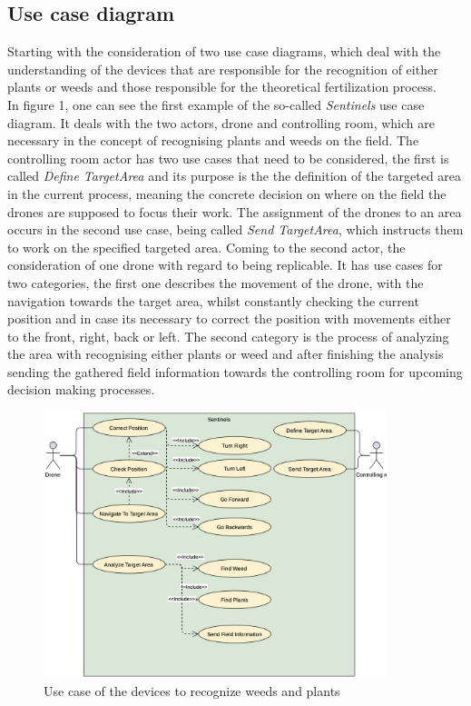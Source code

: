 \documentclass[english]{lni}
\begin{document}
\subsection{Use case diagram}
Starting with the consideration of two use case diagrams, which deal with the understanding of the devices that are responsible for the recognition of either plants or weeds and those responsible for the theoretical fertilization process.\\
In figure 1, one can see the first example of the so-called \textit{Sentinels} use case diagram. It deals with the two actors, drone and controlling room, which are necessary in the concept of recognising plants and weeds on the field. The controlling room actor has two use cases that need to be considered, the first is called \textit{Define TargetArea} and its purpose is the the definition of the targeted area in the current process, meaning the concrete decision on where on the field the drones are supposed to focus their work. The assignment of the drones to an area occurs in the second use case, being called \textit{Send TargetArea}, which instructs them to work on the specified targeted area. Coming to the second actor, the consideration of one drone with regard to being replicable. It has use cases for two categories, the first one describes the movement of the drone, with the navigation towards the target area, whilst constantly checking the current position and in case its necessary to correct the position with movements either to the front, right, back or left. The second category is the process of analyzing the area with recognising either plants or weed and after finishing the analysis sending the gathered field information towards the controlling room for upcoming decision making processes.

\begin{figure}[H]
    \centering
    \includegraphics[width = 10cm]{img/sentinel_usecase.png}
    \caption{Use case of the devices to recognize weeds and plants}
    \label{fig:sentinels_usecases}
\end{figure}
\end{document}
